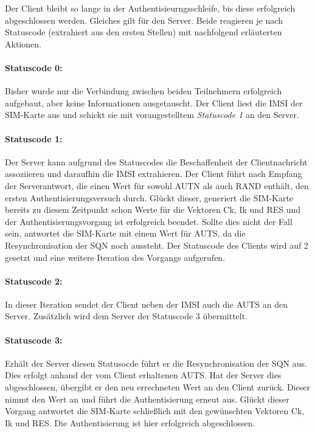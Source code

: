     Der Client bleibt so lange in der Authentisieurngsschleife, bis diese erfolgreich abgeschlossen werden.
    Gleiches gilt für den Server. Beide reagieren je nach Statuscode (extrahiert aus den ersten Stellen)
    mit nachfolgend erläuterten Aktionen.

    \paragraph{Statuscode 0:} Bisher wurde nur die Verbindung zwischen beiden Teilnehmern erfolgreich aufgebaut,
    aber keine Informationen ausgetauscht. Der Client liest die IMSI der SIM-Karte aus und schickt sie mit
    vorangestelltem \textit{Statuscode 1} an den Server.

    \paragraph{Statuscode 1:} Der Server kann aufgrund des Statuscodes die Beschaffenheit
    der Clientnachricht assoziieren und daraufhin die IMSI extrahieren. Der Client führt
    nach Empfang der Serverantwort, die einen Wert für sowohl AUTN als auch RAND enthält, den
    ersten Authentisierungsversuch durch. Glückt dieser, generiert die SIM-Karte bereits zu diesem
    Zeitpunkt schon Werte für die Vektoren Ck, Ik und RES und der Authentisierungsvorgang ist
    erfolgreich beendet. Sollte dies nicht der Fall sein, antwortet die SIM-Karte mit einem Wert für
    AUTS, da die Resynchronisation der SQN noch aussteht. Der Statuscode des Clients wird auf 2 gesetzt
    und eine weitere Iteration des Vorgangs aufgerufen.

    \paragraph{Statuscode 2:} In dieser Iteration sendet der Client neben der IMSI auch die AUTS an den
    Server. Zusätzlich wird dem Server der Statuscode 3 übermittelt.

    \paragraph{Statuscode 3:} Erhält der Server diesen Statusocde führt er die Resynchronisation der SQN
    aus. Dies erfolgt anhand der vom Client erhaltenen AUTS. Hat der Server dies abgeschlossen, übergibt er
    den neu errechneten Wert an den Client zurück. Dieser nimmt den Wert an und führt die Authentisierung
    erneut aus. Glückt dieser Vorgang antwortet die SIM-Karte schließlich mit den gewünschten Vektoren
    Ck, Ik und RES. Die Authentisierung ist hier erfolgreich abgeschlossen.

\clearpage
